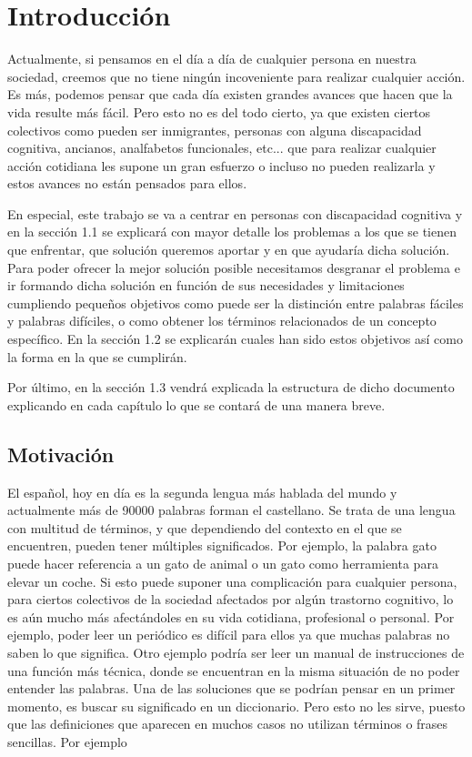 \chapter{Introducción}
\label{cap:introduccion}

Actualmente, si pensamos en el día a día de cualquier persona en nuestra sociedad, creemos que no tiene ningún incoveniente para realizar cualquier acción. Es más, podemos pensar que cada día existen grandes avances que hacen que la vida resulte más fácil.
Pero esto no es del todo cierto, ya que existen ciertos colectivos como pueden ser inmigrantes, personas con alguna discapacidad cognitiva, ancianos, analfabetos funcionales, etc... que para realizar cualquier acción cotidiana les supone un gran esfuerzo o incluso no pueden realizarla y estos avances no están pensados para ellos.

En especial, este trabajo se va a centrar en personas con discapacidad cognitiva y en la sección 1.1 se explicará con mayor detalle los problemas a los que se tienen que enfrentar, que solución queremos aportar y en que ayudaría dicha solución.
Para poder ofrecer la mejor solución posible necesitamos desgranar el problema e ir formando dicha solución en función de sus necesidades y limitaciones cumpliendo pequeños objetivos como puede ser la distinción entre palabras fáciles y palabras difíciles, o como obtener los términos relacionados de un concepto específico. En la sección 1.2 se explicarán cuales han sido estos objetivos así como la forma en la que se cumplirán.

Por último, en la sección 1.3 vendrá explicada la estructura de dicho documento explicando en cada capítulo lo que se contará de una manera breve.


\section{Motivación}
\label{cap:sec:motivacion}

El español, hoy en día es la segunda lengua más hablada del mundo y actualmente más de 90000 palabras forman el castellano. 
Se trata de una lengua con multitud de términos, y que dependiendo del contexto en el que se encuentren, pueden tener múltiples significados. Por ejemplo, la palabra gato puede hacer referencia a un gato de animal o un gato como herramienta para elevar un coche.
Si esto puede suponer una complicación para cualquier persona, para ciertos colectivos de la sociedad afectados por algún trastorno cognitivo, lo es aún mucho más afectándoles en su vida cotidiana, profesional o personal. Por ejemplo, poder leer un periódico es difícil para ellos ya que muchas palabras no saben lo que significa. Otro ejemplo podría ser leer un manual de instrucciones de una función más técnica, donde se encuentran en la misma situación de no poder entender las palabras.
Una de las soluciones que se podrían pensar en un primer momento, es buscar su significado en un diccionario. Pero esto no les sirve, puesto que las definiciones que aparecen en muchos casos no utilizan términos o frases sencillas. Por ejemplo



